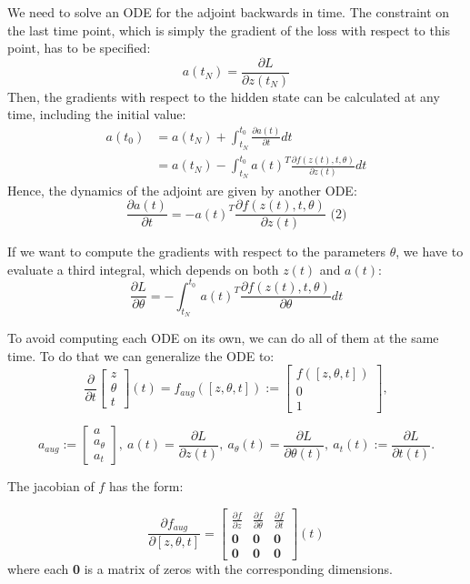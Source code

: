 \documentclass[10pt,a4paper]{article}
\theoremstyle{definition}
\theoremstyle{definition}
\begin{document}
We need to solve an ODE for the adjoint backwards in time. The constraint on the last time point, which is simply the gradient of the loss with respect to this point, has to be specified:
$$
a(t_N) = \frac{\partial L}{\partial z(t_N)}
$$
Then, the gradients with respect to the hidden state can be calculated at any time, including the initial value:
\begin{align*}
a(t_0) &= a(t_N) + \int^{t_0}_{t_N} \frac{\partial a(t)}{\partial t} dt\\
&= a(t_N) - \int^{t_0}_{t_N} a(t)^T \frac{\partial f(z(t),t,\theta)} {\partial z(t)} dt
\end{align*}
Hence, the dynamics of the adjoint are given by another ODE:
$$
\frac{\partial a(t)}{\partial t} = -a(t)^T \frac{\partial f(z(t),t,\theta)} {\partial z(t)} \text{ (2)}
$$

If we want to compute the gradients with respect to the parameters $\theta$, we have to evaluate a third integral, which depends on both $z(t)$ and $a(t)$:
$$
\frac{\partial L}{\partial \theta} = - \int^{t_0}_{t_N} a(t)^T \frac{\partial f(z(t),t,\theta)} {\partial \theta} dt
$$

To avoid computing each ODE on its own, we can do all of them at the same time. To do that we can generalize the ODE to:
$$
\frac{\partial}{\partial t} \begin{bmatrix}
							z \\ \theta \\ t
							\end{bmatrix} (t) 
= f_{aug}([z,\theta ,t]) := \begin{bmatrix}
							f([z,\theta ,t]) \\ 0 \\ 1
							\end{bmatrix},
$$

$$
a_{aug} := \begin{bmatrix}
			a \\ a_{\theta} \\ a_t
			\end{bmatrix}, \ 
a(t) = \frac{\partial L}{\partial z(t)}, \ 
a_\theta (t) = \frac{\partial L}{\partial \theta (t)}, \ 
a_t(t) := \frac{\partial L}{\partial t(t)}.
$$

The jacobian of $f$ has the form:

$$
\frac{\partial f_{aug}}{\partial [z,\theta,t]} = \begin{bmatrix}
\frac{\partial f}{\partial z} & \frac{\partial f}{\partial \theta} & \frac{\partial f}{\partial t} \\
\textbf{0} & \textbf{0} & \textbf{0} \\
\textbf{0} & \textbf{0} & \textbf{0}
\end{bmatrix}(t)
$$
where each \textbf{0} is a matrix of zeros with the corresponding dimensions.
\end{document}
